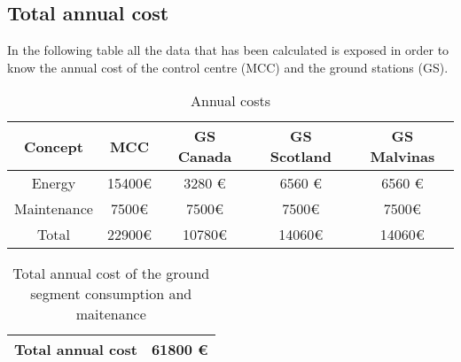 \documentclass[12pt,a4paper]{report}
\begin{document}
\subsection{Total annual cost}
In the following table all the data that has been calculated is exposed in order to know the annual cost of the control centre (MCC) and the ground stations (GS).
\begin{table}[H]
\begin{center}
\begin{tabular}{|c|c|c|c|c|}
\hline
\textbf{Concept}&\textbf{MCC}&\textbf{GS Canada}&\textbf{GS Scotland}&\textbf{GS Malvinas}\\
\hline
Energy&15400\euro &3280 \euro &6560 \euro &6560 \euro\\
\hline
Maintenance&7500\euro &7500\euro &7500\euro &7500\euro \\
\hline
Total&22900\euro &10780\euro &14060\euro &14060\euro \\
\hline
\end{tabular}
\caption{Annual costs}
\end{center}
\end{table}
\begin{table}[H]
\begin{center}
\begin{tabular}{|c|c|}
\hline
\textbf{Total annual cost}&\textbf{61800 \euro}\\
\hline
\end{tabular}
\caption{Total annual cost of the ground segment consumption and maitenance}
\end{center}
\end{table}


\end{document}
